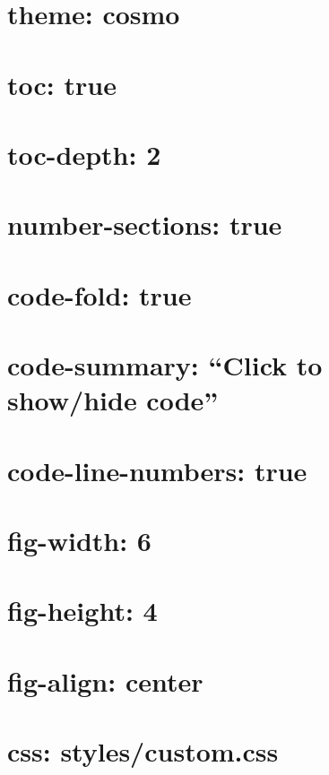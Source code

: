 \documentclass[
  12pt,
  ignorenonframetext,
]{beamer}
\begin{document}
\section{theme: cosmo}\label{theme-cosmo}

\section{toc: true}\label{toc-true}

\section{toc-depth: 2}\label{toc-depth-2}

\section{number-sections: true}\label{number-sections-true}

\section{code-fold: true}\label{code-fold-true}

\section{code-summary: ``Click to show/hide
code''}\label{code-summary-click-to-showhide-code}

\section{code-line-numbers: true}\label{code-line-numbers-true}

\section{fig-width: 6}\label{fig-width-6}

\section{fig-height: 4}\label{fig-height-4}

\section{fig-align: center}\label{fig-align-center}

\section{css: styles/custom.css}\label{css-stylescustom.css}
\end{document}
